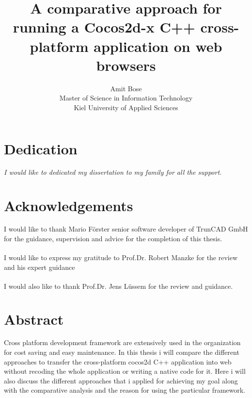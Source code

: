 \documentclass[23pt]{article}
\title{A comparative approach for running a Cocos2d-x C++ cross- platform application on web browsers}
\author{Amit Bose\\  Master of Science in Information Technology\\  Kiel University of Applied Sciences }
\begin{document}
\maketitle
{}
\newpage
{}

\tableofcontents
\listoffigures

\newpage

\setcounter{secnumdepth}{0}

\section{Dedication}

\textit{ \newline \newline I would like to dedicated my dissertation to  my family for all the support. }

\newpage

\section{Acknowledgements}

{\Large  I would like to thank Mario F\"{o}rster senior software developer of TrunCAD GmbH  for the  guidance, supervision and  advice for the completion of this thesis.\\  \\ I would  like to express my gratitude to  Prof.Dr. Robert Manzke for the review and his expert guidance 
 \\ \\  I would also like to thank Prof.Dr. Jens L\"{u}ssem for the review and guidance. \par}

\newpage

\section{Abstract}

{\Large Cross platform development framework are extensively used in the organization for cost saving and easy maintenance. In this thesis i will compare the different approaches to transfer the cross-platform cocos2d C++  application into web without recoding the whole application or writing a native code for it. Here i will also discuss the different approaches that i applied for achieving my goal along with the comparative analysis and the reason for using the particular framework.
\par}
\end{document}
